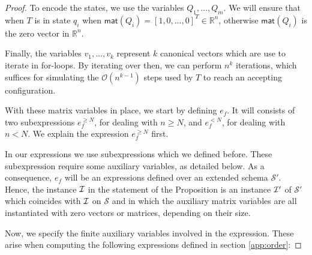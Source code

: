 \begin{proof}
To encode the states, we use the variables $Q_1,\ldots,Q_m$. We will ensure that when $T$ is in state 
$q_i$ when
 $\mathsf{mat}(Q_i)=[1,0,\ldots,0]^T\in\mathbb{R}^n$, otherwise $\mathsf{mat}(Q_i)$ is the zero 
 vector in $\mathbb{R}^n$.	

Finally, the variables $v_1,\ldots,v_{k}$ represent $k$ canonical vectors  which are use to iterate 
in for-loops. By iterating over then, we can perform $n^{k}$ iterations, 
which suffices for simulating the $\mathcal{O}(n^{k-1})$ steps used by $T$ to reach an accepting configuration. 

With these matrix variables in place, we start by defining $e_f$. It will consists of two subexpressions
$e_f^{\geq N}$, for dealing with $n\geq N$, and $e_f^{<N}$, for dealing with $n<N$. We explain the expression
$e_f^{\geq N}$ first.



In our  expressions we use subexpressions which we defined before. These subexpression 
require some auxiliary variables, as detailed below. As a consequence, $e_f$ will be an expressions 
defined over an extended schema $\mathcal{S}'$. Hence, the instance $\mathcal{I}$ in the statement of the Proposition 
is  an instance $\mathcal{I}'$ of $\mathcal{S}'$ which
coincides with $\mathcal{I}$ on $\mathcal{S}$ and in which the auxiliary matrix variables are all instantiated with 
zero vectors or matrices, depending on their size.

Now, we specify the finite auxiliary variables involved in the \langfor expression. These arise
when computing the following \langfor expressions defined in section \ref{app:order}:


\end{proof}
